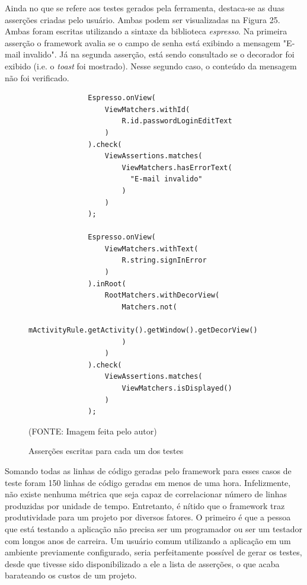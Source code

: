 \documentclass[
    12pt,       %
    openright,      %
    twoside,      %
    a4paper,      %
    english,      %
    french,       %
    spanish,      %
    brazil,       %
    ]{abntex2}
\begin{document}
      Ainda no que se refere aos testes gerados pela ferramenta, destaca-se as duas asserções criadas
      pelo usuário. Ambas podem ser visualizadas na Figura 25. Ambas foram escritas utilizando a sintaxe
      da biblioteca \textit{espresso}. Na primeira asserção o framework avalia se o campo de senha está
      exibindo a mensagem "E-mail invalido". Já na segunda asserção, está sendo consultado se o decorador
      foi exibido (i.e. o \textit{toast} foi mostrado). Nesse segundo caso, o conteúdo da mensagem não foi
      verificado.

      \begin{figure}[htpb]
          \begin{lstlisting}
              Espresso.onView(
                  ViewMatchers.withId(
                      R.id.passwordLoginEditText
                  )
              ).check(
                  ViewAssertions.matches(
                      ViewMatchers.hasErrorText(
                        "E-mail invalido"
                      )
                  )
              );

              Espresso.onView(
                  ViewMatchers.withText(
                      R.string.signInError
                  )
              ).inRoot(
                  RootMatchers.withDecorView(
                      Matchers.not(
                          mActivityRule.getActivity().getWindow().getDecorView()
                      )
                  )
              ).check(
                  ViewAssertions.matches(
                      ViewMatchers.isDisplayed()
                  )
              );
          \end{lstlisting}
          \caption{\label{fig:passaro}Asserções escritas para cada um dos testes}\vspace{-1.2\baselineskip}
          \centering
          \begin{center}(FONTE: Imagem feita pelo autor)\end{center}
      \end{figure}

      Somando todas as linhas de código geradas pelo framework para esses casos de teste foram 150 linhas
      de código geradas em menos de uma hora. Infelizmente, não existe nenhuma métrica que seja capaz de
      correlacionar número de linhas produzidas por unidade de tempo. Entretanto, é nítido que o framework
      traz produtividade para um projeto por diversos fatores. O primeiro é que a pessoa que está testando
      a aplicação não precisa ser um programador ou ser um testador com longos anos de carreira. Um usuário
      comum utilizando a aplicação em um ambiente previamente configurado, seria perfeitamente possível
      de gerar os testes, desde que tivesse sido disponibilizado a ele a lista de asserções,
      o que acaba barateando os custos de um projeto.
\end{document}
